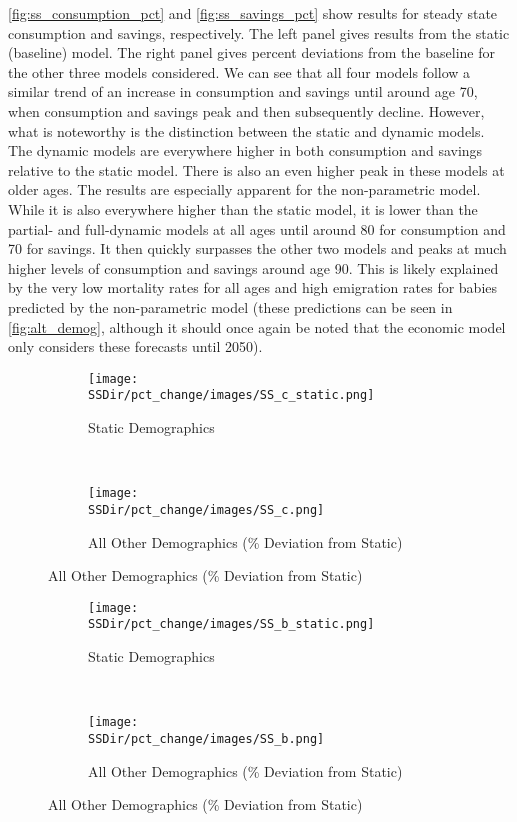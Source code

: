 \documentclass[10pt]{article}
\numberwithin{equation}{subsection}
\newcommand*{\SSDir}{../../code/Rick/OUTPUT/SS}
\begin{document}
\par \autoref{fig:ss_consumption_pct} and \autoref{fig:ss_savings_pct} show results for steady state consumption and savings, respectively. The left panel gives results from the static (baseline) model. The right panel gives percent deviations from the baseline for the other three models considered. We can see that all four models follow a similar trend of an increase in consumption and savings until around age 70, when consumption and savings peak and then subsequently decline. However, what is noteworthy is the distinction between the static and dynamic models. The dynamic models are everywhere higher in both consumption and savings relative to the static model. There is also an even higher peak in these models at older ages. The results are especially apparent for the non-parametric model. While it is also everywhere higher than the static model, it is lower than the partial- and full-dynamic models at all ages until around 80 for consumption and 70 for savings. It then quickly surpasses the other two models and peaks at much higher levels of consumption and savings around age 90. This is likely explained by the very low mortality rates for all ages and high emigration rates for babies predicted by the non-parametric model (these predictions can be seen in \autoref{fig:alt_demog}, although it should once again be noted that the economic model only considers these forecasts until 2050).

\begin{figure}[!ht]
   \caption{\label{fig:ss_consumption_pct}Steady State Consumption}
   \begin{subfigure}{0.5\textwidth}
      \centering
      \texttt{[image: \\SSDir/pct\_change/images/SS\_c\_static.png]}
      \caption{Static Demographics}
   \end{subfigure}%
   ~
   \begin{subfigure}{0.5\textwidth}
      \centering
      \texttt{[image: \\SSDir/pct\_change/images/SS\_c.png]}
      \caption{All Other Demographics (\% Deviation from Static)}
   \end{subfigure}
\end{figure}

\begin{figure}[!ht]
   \caption{\label{fig:ss_savings_pct}Steady State Savings}
   \begin{subfigure}{0.5\textwidth}
      \centering
      \texttt{[image: \\SSDir/pct\_change/images/SS\_b\_static.png]}
      \caption{Static Demographics}
   \end{subfigure}%
   ~
   \begin{subfigure}{0.5\textwidth}
      \centering
      \texttt{[image: \\SSDir/pct\_change/images/SS\_b.png]}
      \caption{All Other Demographics (\% Deviation from Static)}
   \end{subfigure}
\end{figure}
\end{document}
